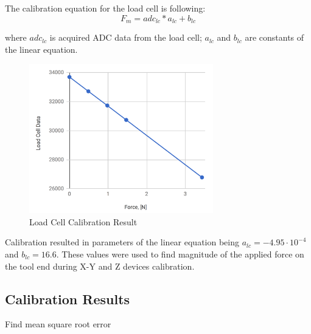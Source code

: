 	The calibration equation for the load cell is following:
\begin{equation}
F_{m} = adc_{lc}*a_{lc} + b_{lc}
\end{equation}

	where $adc_{lc}$ is acquired ADC data from the load cell; $a_{lc}$ and $b_{lc}$ are constants of the linear equation.

\begin{figure}[h]
	\begin{center}
	\includegraphics[width=80mm]{fig/methods/load_cell_calib_data.png}
	\end{center}
	\vspace{-4mm}
	\caption[Load Cell Calibration]
	{Load Cell Calibration Result}
	\label{fig:LC_calib_res}
	\vspace{-2mm}
\end{figure}

	Calibration resulted in parameters of the linear equation being  $a_{lc} = -4.95 \cdot 10^{-4}$ and $b_{lc} = 16.6$. These values were used to find magnitude of the applied force on the tool end during X-Y and Z devices calibration.



	\subsection{Calibration Results}
	Find mean square root error

